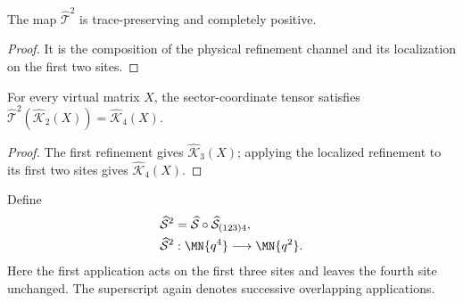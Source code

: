 \begin{lemma}
    \label{thm:mpdo_physical_t_squared_map_cptp}
    \leanok
    The map $\widehat{\mathcal T}^2$ is trace-preserving and completely
    positive.
\end{lemma}

\begin{proof}\leanok
    It is the composition of the physical refinement channel and its
    localization on the first two sites.
\end{proof}

\begin{lemma}
    \label{thm:mpdo_physical_t_squared_closure_identity}
    \leanok
    For every virtual matrix $X$, the sector-coordinate tensor satisfies
    $\widehat{\mathcal T}^2(\widehat{\mathcal K}_2(X))
        =\widehat{\mathcal K}_4(X)$.
\end{lemma}

\begin{proof}\leanok
    The first refinement gives $\widehat{\mathcal K}_3(X)$; applying the
    localized refinement to its first two sites gives
    $\widehat{\mathcal K}_4(X)$.
\end{proof}

\begin{definition}
    \label{def:mpdo_physical_s_squared_map}
    \leanok
    Define
    \begin{align}
        \widehat{\mathcal S}^2
         & =\widehat{\mathcal S}\circ\widehat{\mathcal S}_{(123)4},
        \notag                                                      \\
        \widehat{\mathcal S}^2
         & :\MN{q^4}\longrightarrow\MN{q^2}.
        \notag
    \end{align}
    Here the first application acts on the first three sites and leaves the
    fourth site unchanged. The superscript again denotes successive
    overlapping applications.
\end{definition}

